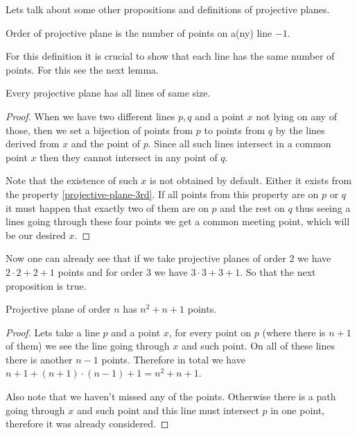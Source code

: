 Lets talk about some other propositions and definitions of projective planes.

\begin{defn}
	Order of projective plane is the number of points on a(ny) line $-1$.
\end{defn}

For this definition it is crucial to show that each line has the same number of points. For this see the next lemma.

\begin{lemma}
	Every projective plane has all lines of same size.
\end{lemma}

\begin{proof}
	When we have two different lines $p,q$ and a point $x$ not lying on any of those, then we set a bijection of points from $p$ to points from $q$ by the lines derived from $x$ and the point of $p$. Since all such lines intersect in a common point $x$ then they cannot intersect in any point of $q$.
	
	Note that the existence of such $x$ is not obtained by default. Either it exists from the property \ref{projective-plane-3rd}. If all points from this property are on $p$ or $q$ it must happen that exactly two of them are on $p$ and the rest on $q$ thus seeing a lines going through these four points we get a common meeting point, which will be our desired $x$.
\end{proof}

Now one can already see that if we take projective planes of order $2$ we have $2 \cdot 2 + 2 + 1$ points and for order $3$ we have $3 \cdot 3 + 3 + 1$. So that the next proposition is true.

\begin{prop}
	Projective plane of order $n$ has $n^2 + n + 1$ points.
\end{prop}

\begin{proof}
	Lets take a line $p$ and a point $x$, for every point on $p$ (where there is $n+1$ of them) we see the line going through $x$ and such point. On all of these lines there is another $n-1$ points. Therefore in total we have $n+1 + (n+1) \cdot (n-1) +1 = n^2 + n +1$.
	
	Also note that we haven't missed any of the points. Otherwise there is a path going through $x$ and such point and this line must intersect $p$ in one point, therefore it was already considered.
\end{proof}

